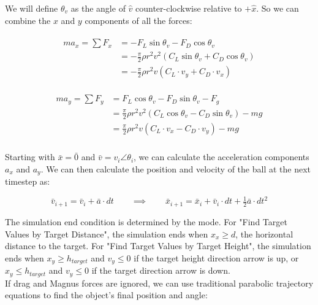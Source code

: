 \documentclass[a4paper]{article}
\begin{document}
	We will define $ \theta_v $ as the angle of $ \hat{v} $ counter-clockwise relative to $ + \hat{x} $. So we can combine the $ x $ and $ y $ components of all the forces:
	
	\begin{gather}
	\begin{aligned}
		m a_x = \sum F_x &= -F_L \sin \theta_v - F_D \cos \theta_v \\
		&= - \frac{\pi}{2} \rho r^2 v^2 \left( C_L \sin \theta_v + C_D \cos \theta_v \right) \\
		&= - \frac{\pi}{2} \rho r^2 v \left( C_L \cdot v_y + C_D \cdot v_x \right)
	\end{aligned}
	\end{gather}
	
	\begin{gather}
		\begin{aligned}
			m a_y = \sum F_y &= F_L \cos \theta_v - F_D \sin \theta_v - F_g \\
			&= \frac{\pi}{2} \rho r^2 v^2 \left( C_L \cos \theta_v - C_D \sin \theta_v \right) - mg \\
			&= \frac{\pi}{2} \rho r^2 v \left( C_L \cdot v_x - C_D \cdot v_y \right) - mg
		\end{aligned}
	\end{gather}
	\\
	Starting with $ \bar{x} = \bar{0} $ and $ \bar{v} = v_i \angle \theta_i $, we can calculate the acceleration components $ a_x $ and $ a_y $. We can then calculate the position and velocity of the ball at the next timestep as:
	
	\begin{equation}
		\bar{v}_{i+1} = \bar{v}_i + \bar{a} \cdot dt \qquad\implies\qquad
		\bar{x}_{i+1} = \bar{x}_{i} + \bar{v}_i \cdot dt + \tfrac{1}{2} \bar{a} \cdot dt^2		
	\end{equation}
	
	\newpage
	The simulation end condition is determined by the mode. For "Find Target Values by Target Distance", the simulation ends when $ x_x \geq d $, the horizontal distance to the target. For "Find Target Values by Target Height", the simulation ends when $ x_y \geq h_{target} $ and $ v_y \leq 0 $ if the target height direction arrow is up, or $ x_y \leq h_{target} $ and $ v_y \leq 0 $ if the target direction arrow is down.\\
	
	If drag and Magnus forces are ignored, we can use traditional parabolic trajectory equations to find the object's final position and angle:
	
\end{document}
